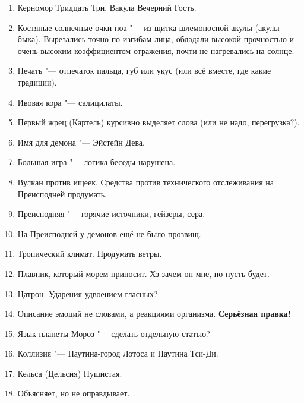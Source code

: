\begin{enumerate}
\item Керномор Тридцать Три, Вакула Вечерний Гость.

\item Костяные солнечные очки ноа "--- из щитка шлемоносной акулы (акулы-быка).
Вырезались точно по изгибам лица, обладали высокой прочностью и очень высоким коэффициентом отражения, почти не нагревались на солнце.

\item Печать "--- отпечаток пальца, губ или укус (или всё вместе, где какие традиции).

\item Ивовая кора "--- салицилаты.

\item Первый жрец (Картель) курсивно выделяет слова (или не надо, перегрузка?).

\item Имя для демона "--- Эйстейн Дева.

\item Большая игра "--- логика беседы нарушена.

\item Вулкан против ищеек.
Средства против технического отслеживания на Преисподней продумать.

\item Преисподняя "--- горячие источники, гейзеры, сера.

\item На Преисподней у демонов ещё не было прозвищ.

\item Тропический климат.
Продумать ветры.

\item Плавник, который морем приносит.
Хз зачем он мне, но пусть будет.

\item Цатрон.
Ударения удвоением гласных?

\item Описание эмоций не словами, а реакциями организма.
\textbf{Серьёзная правка!}

\item Язык планеты Мороз "--- сделать отдельную статью?

\item Коллизия "--- Паутина-город Лотоса и Паутина Тси-Ди.

\item Кельса (Цельсия) Пушистая.

\item Объясняет, но не оправдывает.


\end{enumerate}

